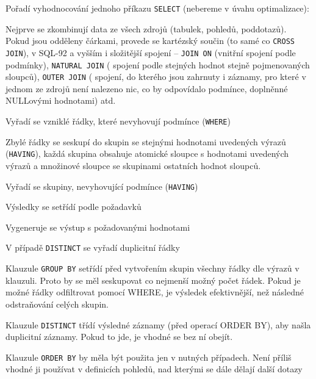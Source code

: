 \medskip\noindent
Pořadí vyhodnocování jednoho příkazu \texttt{SELECT} (nebereme v úvahu optimalizace):
\begin{penumerate}
    \item Nejprve se zkombinují data ze všech zdrojů (tabulek, pohledů, poddotazů). Pokud jsou odděleny čárkami, provede se kartézský součin (to samé co \texttt{CROSS JOIN}), v SQL-92 a vyšším i složitější spojení -- \texttt{JOIN ON} (vnitřní spojení podle podmínky), \texttt{NATURAL JOIN} ( spojení podle stejných hodnot stejně pojmenovaných sloupců), \texttt{OUTER JOIN} ( spojení, do kterého jsou zahrnuty i záznamy, pro které v jednom ze zdrojů není nalezeno nic, co by odpovídalo podmínce, doplněnné NULLovými hodnotami) atd.
    \item Vyřadí se vzniklé řádky, které nevyhovují podmínce (\texttt{WHERE})
    \item Zbylé řádky se seskupí do skupin se stejnými hodnotami uvedených výrazů (\texttt{HAVING}), každá skupina obsahuje atomické sloupce s hodnotami uvedených výrazů a množinové sloupce se skupinami ostatních hodnot sloupců.
    \item Vyřadí se skupiny, nevyhovující podmínce (\texttt{HAVING})
    \item Výsledky se setřídí podle požadavků
    \item Vygeneruje se výstup s požadovanými hodnotami
    \item V případě \texttt{DISTINCT} se vyřadí duplicitní řádky
\end{penumerate}


\begin{poznamka}
\begin{pitemize}
    \item Klauzule \texttt{GROUP BY} setřídí před vytvořením skupin všechny řádky dle výrazů v klauzuli. Proto by se měl seskupovat co nejmenší možný počet řádek. Pokud je možné řádky odfiltrovat pomocí WHERE, je výsledek efektivnější, než následné odstraňování celých skupin.
    \item  Klauzule \texttt{DISTINCT} třídí výsledné záznamy (před operací ORDER BY), aby našla duplicitní záznamy. Pokud to jde, je vhodné se bez ní obejít.
    \item Klauzule \texttt{ORDER BY} by měla být použita jen v nutných případech. Není příliš vhodné ji používat v definicích pohledů, nad kterými se dále dělají další dotazy
\end{pitemize}
\end{poznamka}


